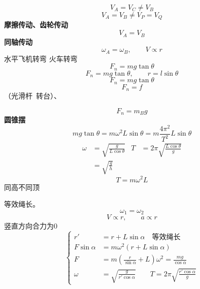 \[ V_A=V_C\neq V_B \]
\[ V_A=V_B\neq V_P=V_Q \]
\textbf{摩擦传动、齿轮传动}
\[ V_A=V_B \]
\textbf{同轴传动}
\[ \omega_A=\omega_B,\qquad V\propto r \]
水平飞机转弯
火车转弯
\[ F_n=mg\tan\theta \]
\[ F_n=mg\tan\theta,\qquad r=l\sin\theta \]
\[ F_n=mg\tan\theta \]
\[ F_n=f \]
（光滑杆\ 转台）、\par
\[ F_n=m_Bg \]
\textbf{圆锥摆}
\[ mg\tan\theta=m\omega^2L\sin\theta=m\frac{4\pi^2}{T^2}L\sin\theta \]
\begin{align*}
\omega&=\sqrt{\frac{g}{L\cos\theta}} & T&=2\pi\sqrt{\frac{L\cos\theta}{g}}\\
&=\sqrt{\frac{g}{h}}
\end{align*}
\[ T=m\omega^2L \]
同高不同顶\par
等效绳长。
\[ \omega_1=\omega_2 \]
\[ V\propto r,\qquad a\propto r \]
竖直方向合力为0
\[
\left\{\begin{aligned}
r'&=r+L\sin\alpha\quad\text{等效绳长}\\
F\sin\alpha&=m\omega^2(r+L\sin\alpha)\\
F&=m\left(\frac{r}{\sin\alpha}+L\right)\omega^2=\frac{mg}{\cos\alpha}\\
\omega&=\sqrt{\frac{g}{r'\cos\alpha}}\qquad T=2\pi\sqrt{\frac{r'\cos\alpha}{g}}
\end{aligned}\right.
\] %
